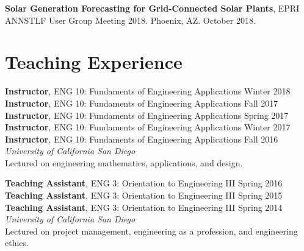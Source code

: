 \documentclass[10pt]{res}
\begin{document}
\begin{resume}
\textbf{Solar Generation Forecasting for Grid-Connected Solar Plants}, EPRI ANNSTLF User Group Meeting 2018. Phoenix, AZ. October 2018.





\section{Teaching Experience}
\vspace{0.1in}

\textbf{Instructor}, ENG 10: Fundaments of Engineering Applications \hfill Winter 2018 \\
\textbf{Instructor}, ENG 10: Fundaments of Engineering Applications \hfill Fall 2017 \\
\textbf{Instructor}, ENG 10: Fundaments of Engineering Applications \hfill Spring 2017 \\
\textbf{Instructor}, ENG 10: Fundaments of Engineering Applications \hfill Winter 2017 \\
\textbf{Instructor}, ENG 10: Fundaments of Engineering Applications \hfill Fall 2016 \\
\textit{University of California San Diego} \\
Lectured on engineering mathematics, applications, and design.

\textbf{Teaching Assistant}, ENG 3: Orientation to Engineering III \hfill Spring 2016 \\
\textbf{Teaching Assistant}, ENG 3: Orientation to Engineering III \hfill Spring 2015 \\
\textbf{Teaching Assistant}, ENG 3: Orientation to Engineering III \hfill Spring 2014 \\
\textit{University of California San Diego} \\
Lectured on project management, engineering as a profession, and engineering ethics.


\end{resume}
\end{document}
